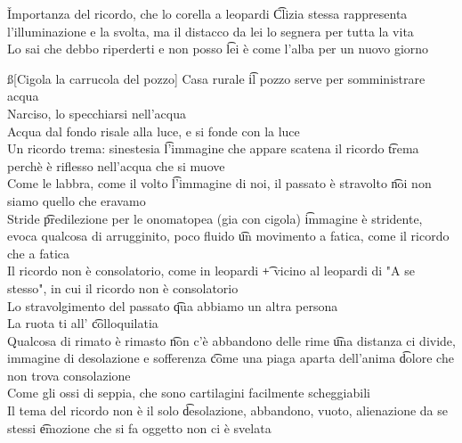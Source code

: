 \documentclass[12pt]{article}
\begin{document}
\v

Importanza del ricordo, che lo corella a leopardi \t Clizia stessa rappresenta l'illuminazione e la svolta, ma il distacco da lei lo segnera per tutta la vita \\
Lo sai che debbo riperderti e non posso \t lei è come l'alba per un nuovo giorno

\ss[Cigola la carrucola del pozzo]
Casa rurale \t il pozzo serve per somministrare acqua \\
Narciso, lo specchiarsi nell'acqua \\
Acqua dal fondo risale alla luce, e si fonde con la luce \\
Un ricordo trema: sinestesia \t l'immagine che appare scatena il ricordo \t trema perchè è riflesso nell'acqua che si muove \\
Come le labbra, come il volto \t l'immagine di noi, il passato è stravolto \t noi non siamo quello che eravamo \\
Stride \t predilezione per le onomatopea (gia con cigola) \t immagine è stridente, evoca qualcosa di arrugginito, poco fluido \t un movimento a fatica, come il ricordo che a fatica \\
Il ricordo non è consolatorio, come in leopardi \t + vicino al leopardi di "A se stesso", in cui il ricordo non è consolatorio \\
Lo stravolgimento del passato \t qua abbiamo un altra persona \\
La ruota ti all' \t colloquilatia \\
Qualcosa di rimato è rimasto \t non c'è abbandono delle rime \t una distanza ci divide, immagine di desolazione e sofferenza \t come una piaga aparta dell'anima \t dolore che non trova consolazione \\
Come gli ossi di seppia, che sono cartilagini facilmente scheggiabili \\
Il tema del ricordo non è il solo \t desolazione, abbandono, vuoto, alienazione da se stessi \t emozione che si fa oggetto non ci è svelata \\
\end{document}
